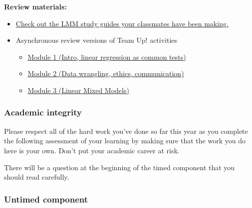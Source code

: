 \documentclass[
  openany]{book}
\begin{document}
\textbf{Review materials:}

\begin{itemize}
\item
  \href{https://q.utoronto.ca/courses/253305/discussion_topics/1637653}{Check out the LMM study guides your classmates have been making.}
\item
  Asynchronous review versions of Team Up! activities

  \begin{itemize}
  \item
    \href{https://jupyter.utoronto.ca/hub/user-redirect/git-pull?repo=https\%3A\%2F\%2Fgithub.com\%2Fsta303-bolton\%2Fsta303-w22-activities\&urlpath=shiny\%2Fsta303-w22-activities\%2Finst\%2Ftutorials\%2Fsta303_m1_teamup_asynch\%2FSTA303_m1_teamup_synch.Rmd\&branch=master}{Module 1 (Intro, linear regression as common tests)}
  \item
    \href{https://jupyter.utoronto.ca/user/4d5187e2-ccd2-4902-8663-8a8c9843584a/git-pull?repo=https\%3A\%2F\%2Fgithub.com\%2Fsta303-bolton\%2Fsta303-w22-activities\&urlpath=shiny\%2Fsta303-w22-activities\%2Finst\%2Ftutorials\%2Fsta303_m2_teamup_asynch\%2FSTA303_m2_teamup_asynch.Rmd\&branch=master}{Module 2 (Data wrangling, ethics, communication)}
  \item
    \href{https://jupyter.utoronto.ca/hub/user-redirect/git-pull?repo=https\%3A\%2F\%2Fgithub.com\%2Fsta303-bolton\%2Fsta303-w22-activities\&urlpath=shiny\%2Fsta303-w22-activities\%2Finst\%2Ftutorials\%2Fsta303_m3_teamup_asynch\%2FSTA303_m3_teamup_asynch.Rmd\&branch=master}{Module 3 (Linear Mixed Models)}
  \end{itemize}
\end{itemize}

\hypertarget{academic-integrity-1}{%
\subsubsection{Academic integrity}\label{academic-integrity-1}}

Please respect all of the hard work you've done so far this year as you complete the following assessment of your learning by making sure that the work you do here is your own. Don't put your academic career at risk.

There will be a question at the beginning of the timed component that you should read carefully.

\hypertarget{untimed-component}{%
\subsubsection{Untimed component}\label{untimed-component}}
\end{document}
